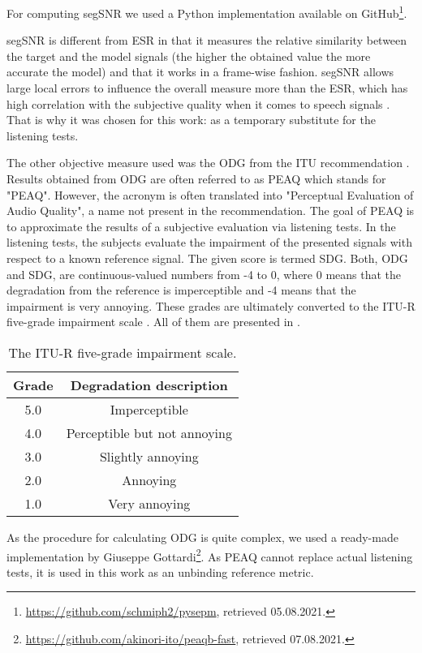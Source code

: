

For computing \ac{segSNR} we used a Python implementation available on GitHub\footnote{\url{https://github.com/schmiph2/pysepm}, retrieved 05.08.2021.}.

\Ac{segSNR} is different from \ac{ESR} in that it measures the relative similarity between the target and the model signals (the higher the obtained value the more accurate the model) and that it works in a frame-wise fashion. \ac{segSNR} allows large local errors to influence the overall measure more than the \ac{ESR}, which has high correlation with the subjective quality when it comes to speech signals \cite{Hansen98}. That is why it was chosen for this work: as a temporary substitute for the listening tests.

The other objective measure used was the \ac{ODG} from the \ac{ITU} recommendation \cite{ITU1387}. 
Results obtained from \ac{ODG} are often referred to as \acs{PEAQ} which stands for "\acl{PEAQ}". However, the acronym is often translated into "Perceptual Evaluation of Audio Quality", a name not present in the recommendation. The goal of \acs{PEAQ} is to approximate the results of a subjective evaluation via listening tests. In the listening tests, the subjects evaluate the impairment of the presented signals with respect to a known reference signal. The given score is termed \ac{SDG}. Both, \ac{ODG} and \ac{SDG}, are continuous-valued numbers from -4 to 0, where 0 means that the degradation from the reference is imperceptible and -4 means that the impairment is very annoying. These grades are ultimately converted to the ITU-R five-grade impairment scale \cite{ITU1387}. All of them are presented in .

\begin{table}
  \centering
  \caption{The ITU-R five-grade impairment scale.}
  \begin{tabular}{c | c}
    \toprule
    \textbf{Grade} & \textbf{Degradation description} \\ \midrule
    5.0 & Imperceptible \\
    4.0 & Perceptible but not annoying \\
    3.0 & Slightly annoying \\
    2.0 & Annoying \\
    1.0 & Very annoying\\
  \end{tabular}
  \label{tab:itu_impairment_scale}
\end{table}

As the procedure for calculating \ac{ODG} is quite complex, we used a ready-made implementation by Giuseppe Gottardi\footnote{\url{https://github.com/akinori-ito/peaqb-fast}, retrieved 07.08.2021.}. As \acs{PEAQ} cannot replace actual listening tests, it is used in this work as an unbinding reference metric.
